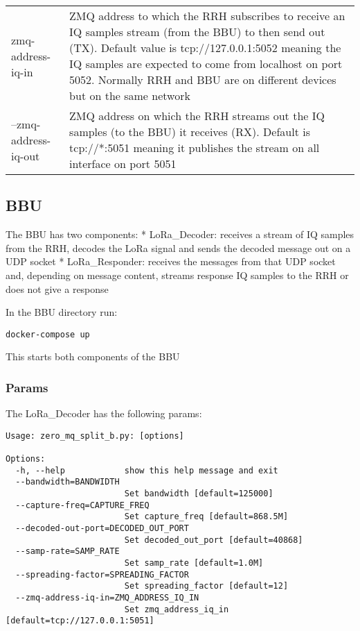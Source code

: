 \begin{longtable}[]{@{}ll@{}}
\begin{minipage}[t]{0.18\columnwidth}
zmq-address-iq-in\strut
\end{minipage} & \begin{minipage}[t]{0.18\columnwidth}\raggedright\strut
ZMQ address to which the RRH subscribes to receive an IQ samples stream
(from the BBU) to then send out (TX). Default value is
tcp://127.0.0.1:5052 meaning the IQ samples are expected to come from
localhost on port 5052. Normally RRH and BBU are on different devices
but on the same network\strut
\end{minipage}\tabularnewline
\begin{minipage}[t]{0.18\columnwidth}\raggedright\strut
--zmq-address-iq-out\strut
\end{minipage} & \begin{minipage}[t]{0.18\columnwidth}\raggedright\strut
ZMQ address on which the RRH streams out the IQ samples (to the BBU) it
receives (RX). Default is tcp://*:5051 meaning it publishes the stream
on all interface on port 5051\strut
\end{minipage}\tabularnewline
\bottomrule
\end{longtable}

\subsection{BBU}\label{bbu}

The BBU has two components: * LoRa\_Decoder: receives a stream of IQ
samples from the RRH, decodes the LoRa signal and sends the decoded
message out on a UDP socket * LoRa\_Responder: receives the messages
from that UDP socket and, depending on message content, streams response
IQ samples to the RRH or does not give a response

In the BBU directory run:

\begin{verbatim}
docker-compose up 
\end{verbatim}

This starts both components of the BBU

\subsubsection{Params}\label{params}

The LoRa\_Decoder has the following params:

\begin{verbatim}
Usage: zero_mq_split_b.py: [options]

Options:
  -h, --help            show this help message and exit
  --bandwidth=BANDWIDTH
                        Set bandwidth [default=125000]
  --capture-freq=CAPTURE_FREQ
                        Set capture_freq [default=868.5M]
  --decoded-out-port=DECODED_OUT_PORT
                        Set decoded_out_port [default=40868]
  --samp-rate=SAMP_RATE
                        Set samp_rate [default=1.0M]
  --spreading-factor=SPREADING_FACTOR
                        Set spreading_factor [default=12]
  --zmq-address-iq-in=ZMQ_ADDRESS_IQ_IN
                        Set zmq_address_iq_in [default=tcp://127.0.0.1:5051]
\end{verbatim}

